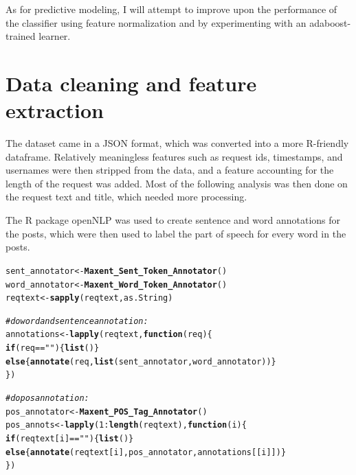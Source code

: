 \documentclass{article}\usepackage[]{graphicx}\usepackage[]{color}
\makeatletter
\newcommand{\hlnum}[1]{\textcolor[rgb]{0.686,0.059,0.569}{#1}}%
\newcommand{\hlstr}[1]{\textcolor[rgb]{0.192,0.494,0.8}{#1}}%
\newcommand{\hlcom}[1]{\textcolor[rgb]{0.678,0.584,0.686}{\textit{#1}}}%
\newcommand{\hlopt}[1]{\textcolor[rgb]{0,0,0}{#1}}%
\newcommand{\hlstd}[1]{\textcolor[rgb]{0.345,0.345,0.345}{#1}}%
\newcommand{\hlkwa}[1]{\textcolor[rgb]{0.161,0.373,0.58}{\textbf{#1}}}%
\newcommand{\hlkwb}[1]{\textcolor[rgb]{0.69,0.353,0.396}{#1}}%
\newcommand{\hlkwc}[1]{\textcolor[rgb]{0.333,0.667,0.333}{#1}}%
\newcommand{\hlkwd}[1]{\textcolor[rgb]{0.737,0.353,0.396}{\textbf{#1}}}%
\newenvironment{kframe}{%
 \def\at@end@of@kframe{}%
 \ifinner\ifhmode%
  \def\at@end@of@kframe{\end{minipage}}%
  \begin{minipage}{\columnwidth}%
 \fi\fi%
 \def\FrameCommand##1{\hskip\@totalleftmargin \hskip-\fboxsep
 \colorbox{shadecolor}{##1}\hskip-\fboxsep
     \hskip-\linewidth \hskip-\@totalleftmargin \hskip\columnwidth}%
 \MakeFramed {\advance\hsize-\width
   \@totalleftmargin\z@ \linewidth\hsize
   \@setminipage}}%
 {\par\unskip\endMakeFramed%
 \at@end@of@kframe}
\newenvironment{knitrout}{}{} %
\makeatother
\begin{document}
As for predictive modeling, I will attempt to improve upon the performance of the classifier using feature normalization and by experimenting with an adaboost-trained learner.


\newpage


\section{Data cleaning and feature extraction}

The dataset came in a JSON format, which was converted into a more R-friendly dataframe. Relatively meaningless features such as request ids, timestamps, and usernames were then stripped from the data, and a feature accounting for the length of the request was added. Most of the following analysis was then done on the request text and title, which needed more processing.

The R package openNLP was used to create sentence and word annotations for the posts, which were then used to label the part of speech for every word in the posts.

\begin{knitrout}
\color{fgcolor}\begin{kframe}
\begin{alltt}
  \hlstd{sent_annotator} \hlkwb{<-} \hlkwd{Maxent_Sent_Token_Annotator}\hlstd{()}
  \hlstd{word_annotator} \hlkwb{<-} \hlkwd{Maxent_Word_Token_Annotator}\hlstd{()}
  \hlstd{reqtext} \hlkwb{<-} \hlkwd{sapply}\hlstd{(reqtext, as.String)}

  \hlcom{# do word and sentence annotation:}
  \hlstd{annotations} \hlkwb{<-} \hlkwd{lapply}\hlstd{(reqtext,} \hlkwa{function}\hlstd{(}\hlkwc{req}\hlstd{) \{}
    \hlkwa{if} \hlstd{(req} \hlopt{==} \hlstr{""}\hlstd{) \{}\hlkwd{list}\hlstd{()\}}
    \hlkwa{else} \hlstd{\{}\hlkwd{annotate}\hlstd{(req,} \hlkwd{list}\hlstd{(sent_annotator, word_annotator))\}}
  \hlstd{\})}

  \hlcom{#do pos annotation:}
  \hlstd{pos_annotator} \hlkwb{<-} \hlkwd{Maxent_POS_Tag_Annotator}\hlstd{()}
  \hlstd{pos_annots} \hlkwb{<-} \hlkwd{lapply}\hlstd{(}\hlnum{1}\hlopt{:}\hlkwd{length}\hlstd{(reqtext),} \hlkwa{function}\hlstd{(}\hlkwc{i}\hlstd{) \{}
    \hlkwa{if} \hlstd{(reqtext[i]} \hlopt{==} \hlstr{""}\hlstd{) \{}\hlkwd{list}\hlstd{()\}}
    \hlkwa{else} \hlstd{\{}\hlkwd{annotate}\hlstd{(reqtext[i], pos_annotator, annotations[[i]])\}}
  \hlstd{\})}
\end{alltt}
\end{kframe}
\end{knitrout}
\end{document}
